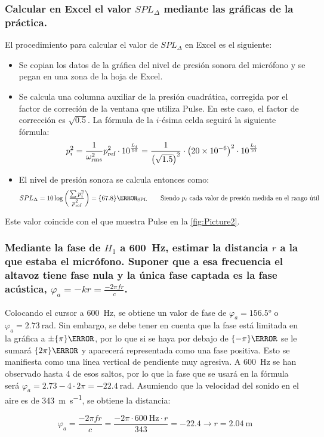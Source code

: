 \documentclass[10pt]{article}
\begin{document}
\subsubsection{Calcular en Excel el valor $SPL_{\Delta}$ mediante las gráficas de la práctica.}

El procedimiento para calcular el valor de $SPL_{\Delta}$ en Excel es el siguiente:

\begin{itemize}
  \item Se copian los datos de la gráfica del nivel de presión sonora del micrófono y se pegan en una zona de la hoja de Excel.
  \item Se calcula una columna auxiliar de la presión cuadrática, corregida por el factor de correción de la ventana que utiliza Pulse. En este caso, el factor de corrección es $\sqrt{0.5}$. La fórmula de la $i$-ésima celda seguirá la siguiente fórmula:
        \[ p_i^2 = \frac{1}{\omega^2_{\text{rms}}} p^2 _{\textnormal{ref}} \cdot 10^{\frac{L_i}{10}} = \frac{1}{\left( \sqrt{1.5} \right)^2} \cdot \left( \num{20e-6} \right)^2 \cdot 10^{\frac{L_i}{10}} \]
  \item El nivel de presión sonora se calcula entonces como:
        \[ SPL_{\Delta} = 10 \log \left( \frac{\sum p_i^2}{p^2 _{\textnormal{ref}}} \right) = \qty{67.8}{\dB_{\text{SPL}}} \qquad \text{Siendo }p_i \text{ cada valor de presión medida en el rango útil} \]
\end{itemize}

Este valor coincide con el que muestra Pulse en la \autoref{fig:Picture2}.

\subsubsection{Mediante la fase de $H_1$ a \SI{600}{\Hz}, estimar la distancia $r$ a la que estaba el micrófono. Suponer que a esa frecuencia el altavoz tiene fase nula y la única fase captada es la fase acústica, $\varphi _a = -kr = \frac{-2\pi fr}{c}$.}

Colocando el cursor a \qty{600}{\hertz }, se obtiene un valor de fase de $\varphi _a = \ang{156.5}$ o $\varphi _a = \qty{2.73}{\radian }$. Sin embargo, se debe tener en cuenta que la fase está limitada en la gráfica a $\pm \qty{\pi}{\radian } $, por lo que si se haya por debajo de $\qty{-\pi}{\radian }$ se le sumará $\qty{2\pi}{\radian }$ y aparecerá representada como una fase positiva. Esto se manifiesta como una línea vertical de pendiente muy agresiva. A \qty{600}{\hertz } se han observado hasta 4 de esos saltos, por lo que la fase que se usará en la fórmula será $\varphi _a = 2.73 - 4 \cdot 2\pi = \qty{-22.4}{\radian } $. Asumiendo que la velocidad del sonido en el aire es de \qty{343}{\metre \per \second }, se obtiene la distancia:

\[ \varphi _a = \frac{-2\pi f r }{c} = \frac{-2\pi \cdot \qty{600}{\hertz } \cdot r}{343} = -22.4 \rightarrow r = \boxed{\qty{2.04}{\metre }} \]
\end{document}
